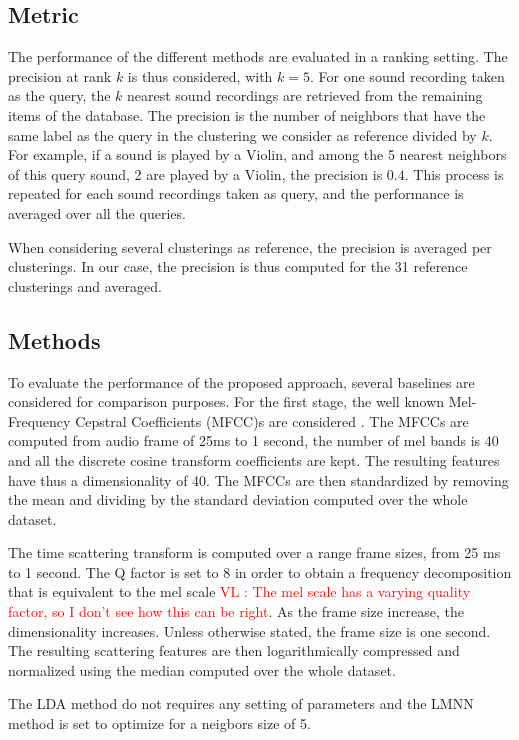 \documentclass{article}
\newcommand{\vl}[1]{\textcolor{red}{VL : #1}}
\begin{document}
\subsection{Metric}

The performance of the different methods are evaluated in a ranking setting. The precision at rank $k$ is thus considered, with $k=5$. For one sound recording taken as the query, the $k$ nearest sound recordings are retrieved from the remaining items of the database. The precision is the number of neighbors that have the same label as the query in the clustering we consider as reference divided by $k$. For example, if a sound is played by a Violin, and among the 5 nearest neighbors of this query sound, 2 are played by a Violin, the precision is $0.4$. This process is repeated for each sound recordings taken as query, and the performance is averaged over all the queries.

When considering several clusterings as reference, the precision is averaged per clusterings. In our case, the precision is thus computed for the 31 reference clusterings and averaged.

\subsection{Methods}

To evaluate the performance of the proposed approach, several baselines are considered for comparison purposes. For the first stage, the well known Mel-Frequency Cepstral Coefficients (MFCC)s are considered \cite{rabiner1993fundamentals}. The MFCCs are computed from audio frame of 25ms to 1 second, the number of mel bands is 40 and all the discrete cosine transform coefficients are kept. The resulting features have thus a dimensionality of 40. The MFCCs are then standardized by removing the mean and dividing by the standard deviation computed over the whole dataset.

The time scattering transform is computed over a range frame sizes, from 25 ms to 1 second. The Q factor is set to 8 in order to obtain a frequency decomposition that is equivalent to the mel scale \vl{The mel scale has a varying quality factor, so I don't see how this can be right}. As the frame size increase, the dimensionality increases. Unless otherwise stated, the frame size is one second. The resulting scattering features are then logarithmically compressed and normalized using the median computed over the whole dataset.

The LDA method do not requires any setting of parameters and the LMNN method is set to optimize for a neigbors size of 5.
\end{document}

